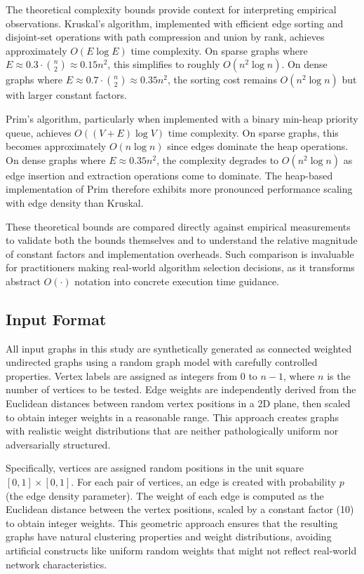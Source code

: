 ﻿\documentclass[12pt]{article}
\begin{document}
The theoretical complexity bounds provide context for interpreting empirical observations. Kruskal's algorithm, implemented with efficient edge sorting and disjoint-set operations with path compression and union by rank, achieves approximately $O(E \log E)$ time complexity. On sparse graphs where $E \approx 0.3 \cdot \binom{n}{2} \approx 0.15 n^2$, this simplifies to roughly $O(n^2 \log n)$. On dense graphs where $E \approx 0.7 \cdot \binom{n}{2} \approx 0.35 n^2$, the sorting cost remains $O(n^2 \log n)$ but with larger constant factors.

Prim's algorithm, particularly when implemented with a binary min-heap priority queue, achieves $O((V + E) \log V)$ time complexity. On sparse graphs, this becomes approximately $O(n \log n)$ since edges dominate the heap operations. On dense graphs where $E \approx 0.35 n^2$, the complexity degrades to $O(n^2 \log n)$ as edge insertion and extraction operations come to dominate. The heap-based implementation of Prim therefore exhibits more pronounced performance scaling with edge density than Kruskal.

These theoretical bounds are compared directly against empirical measurements to validate both the bounds themselves and to understand the relative magnitude of constant factors and implementation overheads. Such comparison is invaluable for practitioners making real-world algorithm selection decisions, as it transforms abstract $O(\cdot)$ notation into concrete execution time guidance.

\subsection{Input Format}

All input graphs in this study are synthetically generated as connected weighted undirected graphs using a random graph model with carefully controlled properties. Vertex labels are assigned as integers from $0$ to $n-1$, where $n$ is the number of vertices to be tested. Edge weights are independently derived from the Euclidean distances between random vertex positions in a 2D plane, then scaled to obtain integer weights in a reasonable range. This approach creates graphs with realistic weight distributions that are neither pathologically uniform nor adversarially structured.

Specifically, vertices are assigned random positions in the unit square $[0,1] \times [0,1]$. For each pair of vertices, an edge is created with probability $p$ (the edge density parameter). The weight of each edge is computed as the Euclidean distance between the vertex positions, scaled by a constant factor (10) to obtain integer weights. This geometric approach ensures that the resulting graphs have natural clustering properties and weight distributions, avoiding artificial constructs like uniform random weights that might not reflect real-world network characteristics.
\end{document}
